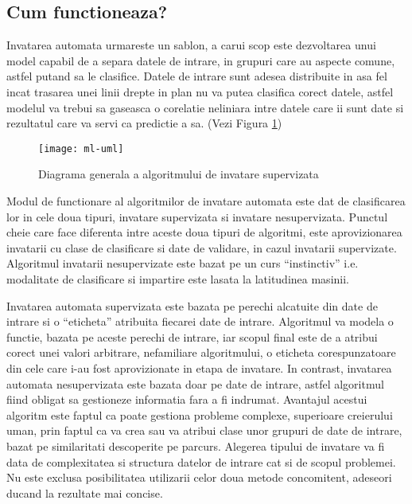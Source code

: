 	
	\subsection{Cum functioneaza?}
	Invatarea automata urmareste un sablon, a carui scop este dezvoltarea unui model capabil de a separa datele de intrare, in grupuri care au aspecte comune, astfel putand sa le clasifice. Datele de intrare sunt adesea distribuite in asa fel incat trasarea unei linii drepte in plan nu va putea clasifica corect datele, astfel  modelul va trebui sa gaseasca o corelatie neliniara intre datele care ii sunt date si rezultatul care va servi ca predictie a sa. (Vezi Figura \ref{fig:uml-diagram})
	

	
	\begin{figure}[H]
		\texttt{[image: ml-uml]}  
		\caption{\label{fig:uml-diagram} Diagrama generala a algoritmului de invatare supervizata
		\protect
		\cite{ml_intro}}
	\end{figure}


	\newpage
	
	Modul de functionare al algoritmilor de invatare automata este dat de clasificarea lor in cele doua tipuri, invatare supervizata si invatare nesupervizata. Punctul cheie care face diferenta intre aceste doua tipuri de algoritmi, este aprovizionarea invatarii cu clase de clasificare si date de validare, in cazul invatarii supervizate. Algoritmul invatarii nesupervizate este bazat pe un curs “instinctiv” i.e. modalitate de clasificare si impartire este lasata la latitudinea masinii.
	
	Invatarea automata supervizata este bazata pe perechi alcatuite din date de intrare si o “eticheta” atribuita fiecarei date de intrare. Algoritmul va modela o functie, bazata pe aceste perechi de intrare, iar scopul final este de a atribui corect unei valori arbitrare, nefamiliare algoritmului, o eticheta corespunzatoare din cele care i-au fost aprovizionate in etapa de invatare. 
	In contrast, invatarea automata nesupervizata este bazata doar pe date de intrare, astfel algoritmul fiind obligat sa gestioneze informatia fara a fi indrumat. Avantajul acestui algoritm este faptul ca poate gestiona probleme complexe, superioare creierului uman, prin faptul ca va crea sau va atribui clase unor grupuri de date de intrare, bazat pe similaritati descoperite pe parcurs.
	Alegerea tipului de invatare va fi data de complexitatea si structura  datelor de intrare cat si de scopul problemei. Nu este exclusa posibilitatea utilizarii celor doua metode concomitent, adeseori ducand la rezultate mai concise.
	
